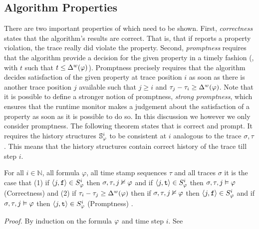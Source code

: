 \subsection{Algorithm Properties}
There are two important properties of \monitor which need to be shown. First, \emph{correctness} states that the algorithm's results are correct.
That is, that if \monitor reports a property violation, the trace really did violate the property.
Second, \emph{promptness} requires that the algorithm provide a decision for the given property in a timely fashion (\ie, with $t$ such that $t\leq \Delta^w(\varphi)$).
Promptness precisely requires that the algorithm decides satisfaction of the given property at trace position $i$ as soon as there is another trace position $j$ available such that $j\geq i$ and $\tau_j-\tau_i \geq \Delta^w(\varphi)$.
Note that it is possible to define a stronger notion of promptness, \emph{strong promptness}, which ensures that the runtime monitor makes a judgement about the satisfaction of a property as soon as it is possible to do so. In this discussion we however we only consider promptness.
%
%
The following theorem states that \monitor is correct and prompt. It requires  the history structures $\mathbb{S}^{i}_{\varphi}$ to be consistent at $i$ analogous to the trace $\sigma,\tau$.
This means that the history structures contain correct history of the trace till step $i$. %

\begin{theorem}
For all $i \in \mathbb{N}$, all formula $\varphi$, all time stamp sequences $\tau$ and all traces $\sigma$ it is the case that (1) if $\langle j, \mathrm{\texttt{f}} \rangle \in {S}^{i}_{\varphi}$ then $\sigma, \tau, j \nvDash \varphi$ and if $\langle j, \mathrm{\texttt{t}} \rangle \in {S}^{i}_{\varphi}$ then $\sigma, \tau, j \vDash \varphi$ (Correctness) and (2) if $\tau_i - \tau_j \geq \Delta^w(\varphi)$ then if $\sigma, \tau, j \nvDash \varphi$ then $\langle j, \mathrm{\texttt{f}} \rangle \in {S}^{i}_{\varphi}$ and if $\sigma, \tau, j \vDash \varphi$ then $\langle j, \mathrm{\texttt{t}} \rangle \in {S}^{i}_{\varphi}$ (Promptness)
.
\end{theorem}
\textit{Proof.} By  induction on the  formula $\varphi$ and time step $i$. See \cite{Kane2015} \\

